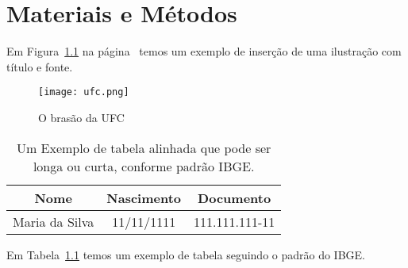 \documentclass[monografia]{subfiles}
\begin{document}
	\chapter{Materiais e Métodos}

	Em Figura~\ref{fig:brasao} na página~\pageref{fig:brasao} temos um 
	exemplo de inserção de uma ilustração com título e fonte.

	\begin{figure}[htb]
		\centering
		\caption{O brasão da UFC}
		\texttt{[image: ufc.png]}
		\label{fig:brasao}
	\end{figure}


	\begin{table}[htb] 
		\IBGEtab
		{
			\caption{Um Exemplo de tabela alinhada que pode ser longa ou curta, conforme padrão IBGE.}
			\label{tab:ibge}
		}
		{ 
			\begin{tabular}{ccc} \toprule 
				Nome & Nascimento & Documento \\ \midrule \midrule 
				Maria da Silva & 11/11/1111 & 111.111.111-11 \\ \bottomrule 
			\end{tabular}
		}
		{
		} 
	\end{table}

	Em Tabela~\ref{tab:ibge} temos um exemplo de tabela seguindo o padrão do IBGE.
\end{document}
